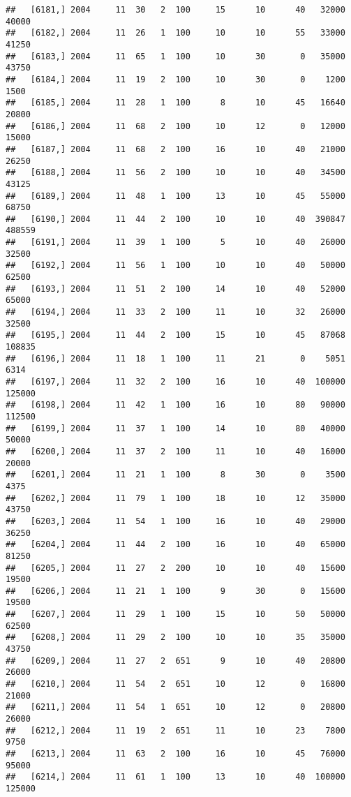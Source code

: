 \documentclass{article}\usepackage[]{graphicx}\usepackage[]{color}
\makeatletter
\newenvironment{kframe}{%
 \def\at@end@of@kframe{}%
 \ifinner\ifhmode%
  \def\at@end@of@kframe{\end{minipage}}%
  \begin{minipage}{\columnwidth}%
 \fi\fi%
 \def\FrameCommand##1{\hskip\@totalleftmargin \hskip-\fboxsep
 \colorbox{shadecolor}{##1}\hskip-\fboxsep
     \hskip-\linewidth \hskip-\@totalleftmargin \hskip\columnwidth}%
 \MakeFramed {\advance\hsize-\width
   \@totalleftmargin\z@ \linewidth\hsize
   \@setminipage}}%
 {\par\unskip\endMakeFramed%
 \at@end@of@kframe}
\newenvironment{knitrout}{}{} %
\makeatother
\begin{document}
\begin{knitrout}
\begin{kframe}
\begin{verbatim}
##   [6181,] 2004     11  30   2  100     15      10      40   32000   40000
##   [6182,] 2004     11  26   1  100     10      10      55   33000   41250
##   [6183,] 2004     11  65   1  100     10      30       0   35000   43750
##   [6184,] 2004     11  19   2  100     10      30       0    1200    1500
##   [6185,] 2004     11  28   1  100      8      10      45   16640   20800
##   [6186,] 2004     11  68   2  100     10      12       0   12000   15000
##   [6187,] 2004     11  68   2  100     16      10      40   21000   26250
##   [6188,] 2004     11  56   2  100     10      10      40   34500   43125
##   [6189,] 2004     11  48   1  100     13      10      45   55000   68750
##   [6190,] 2004     11  44   2  100     10      10      40  390847  488559
##   [6191,] 2004     11  39   1  100      5      10      40   26000   32500
##   [6192,] 2004     11  56   1  100     10      10      40   50000   62500
##   [6193,] 2004     11  51   2  100     14      10      40   52000   65000
##   [6194,] 2004     11  33   2  100     11      10      32   26000   32500
##   [6195,] 2004     11  44   2  100     15      10      45   87068  108835
##   [6196,] 2004     11  18   1  100     11      21       0    5051    6314
##   [6197,] 2004     11  32   2  100     16      10      40  100000  125000
##   [6198,] 2004     11  42   1  100     16      10      80   90000  112500
##   [6199,] 2004     11  37   1  100     14      10      80   40000   50000
##   [6200,] 2004     11  37   2  100     11      10      40   16000   20000
##   [6201,] 2004     11  21   1  100      8      30       0    3500    4375
##   [6202,] 2004     11  79   1  100     18      10      12   35000   43750
##   [6203,] 2004     11  54   1  100     16      10      40   29000   36250
##   [6204,] 2004     11  44   2  100     16      10      40   65000   81250
##   [6205,] 2004     11  27   2  200     10      10      40   15600   19500
##   [6206,] 2004     11  21   1  100      9      30       0   15600   19500
##   [6207,] 2004     11  29   1  100     15      10      50   50000   62500
##   [6208,] 2004     11  29   2  100     10      10      35   35000   43750
##   [6209,] 2004     11  27   2  651      9      10      40   20800   26000
##   [6210,] 2004     11  54   2  651     10      12       0   16800   21000
##   [6211,] 2004     11  54   1  651     10      12       0   20800   26000
##   [6212,] 2004     11  19   2  651     11      10      23    7800    9750
##   [6213,] 2004     11  63   2  100     16      10      45   76000   95000
##   [6214,] 2004     11  61   1  100     13      10      40  100000  125000

\end{verbatim}
\end{kframe}
\end{knitrout}
\end{document}
